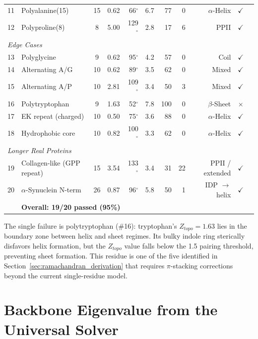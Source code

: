 \begin{table}[H]
\begin{tabular}{@{}r l c c r r r r r c c@{}}
11 & Polyalanine(15)            & 15 & 0.62 &  66$^\circ$ & 6.7 & 77 &  0 & $\alpha$-Helix     & $\checkmark$ \\
12 & Polyproline(8)             &  8 & 5.00 & 129$^\circ$ & 2.8 & 17 &  6 & PPII               & $\checkmark$ \\
\midrule
\multicolumn{10}{l}{\textit{Edge Cases}} \\
13 & Polyglycine                &  9 & 0.62 &  95$^\circ$ & 4.2 & 57 &  0 & Coil               & $\checkmark$ \\
14 & Alternating A/G            & 10 & 0.62 &  89$^\circ$ & 3.5 & 62 &  0 & Mixed              & $\checkmark$ \\
15 & Alternating A/P            & 10 & 2.81 & 109$^\circ$ & 3.4 & 50 &  3 & Mixed              & $\checkmark$ \\
16 & Polytryptophan             &  9 & 1.63 &  52$^\circ$ & 7.8 &100 &  0 & $\beta$-Sheet      & $\times$     \\
17 & EK repeat (charged)        & 10 & 0.50 &  75$^\circ$ & 3.6 & 88 &  0 & $\alpha$-Helix     & $\checkmark$ \\
18 & Hydrophobic core           & 10 & 0.82 & 100$^\circ$ & 3.3 & 62 &  0 & $\alpha$-Helix     & $\checkmark$ \\
\midrule
\multicolumn{10}{l}{\textit{Longer Real Proteins}} \\
19 & Collagen-like (GPP repeat) & 15 & 3.54 & 133$^\circ$ & 3.4 & 31 & 22 & PPII / extended    & $\checkmark$ \\
20 & $\alpha$-Synuclein N-term  & 26 & 0.87 &  96$^\circ$ & 5.8 & 50 &  1 & IDP $\to$ helix    & $\checkmark$ \\
\midrule
   & \multicolumn{8}{l}{\textbf{Overall: 19/20 passed (95\%)}} & \\
\bottomrule
\end{tabular}
\end{table}

The single failure is polytryptophan (\#16): tryptophan's $Z_{topo} = 1.63$ lies in the boundary zone between helix and sheet regimes. Its bulky indole ring sterically disfavors helix formation, but the $Z_{topo}$ value falls below the 1.5 pairing threshold, preventing sheet formation. This residue is one of the five identified in Section~\ref{sec:ramachandran_derivation} that requires $\pi$-stacking corrections beyond the current single-residue model.

\section{Backbone Eigenvalue from the Universal Solver}
\label{sec:backbone_eigenvalue}

